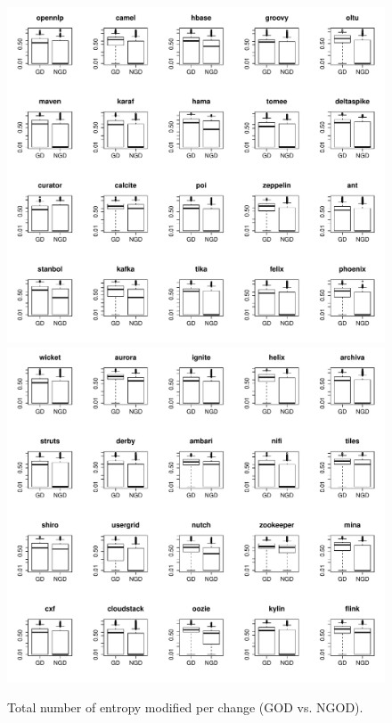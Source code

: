 \begin{figure}[tb]
	\centering
	\includegraphics[width=120mm]{figures/chapter4/rq3_god_entropy_logged_1}
	\includegraphics[width=120mm]{figures/chapter4/rq3_god_entropy_logged_2}
	\caption{Total number of entropy modified per change (GOD vs. NGOD).}
	\label{figure:total_entropy_god_vs_ngod}
\end{figure}


